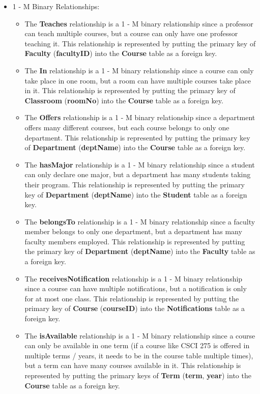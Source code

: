 \documentclass{report}
\begin{document}
\begin{itemize}
    \item 1 - M Binary Relationships:
    \begin{itemize}
        \item The \textbf{Teaches} relationship is a 1 - M binary relationship since a professor can teach multiple courses, but a course can only have one professor teaching it. This relationship is represented by putting the primary key of \textbf{Faculty} (\textbf{facultyID}) into the \textbf{Course} table as a foreign key.
        \item The \textbf{In} relationship is a 1 - M binary relationship since a course can only take place in one room, but a room can have multiple courses take place in it. This relationship is represented by putting the primary key of \textbf{Classroom} (\textbf{roomNo}) into the \textbf{Course} table as a foreign key.
        \item The \textbf{Offers} relationship is a 1 - M binary relationship since a department offers many different courses, but each course belongs to only one department. This relationship is represented by putting the primary key of \textbf{Department} (\textbf{deptName}) into the \textbf{Course} table as a foreign key.
        \item The \textbf{hasMajor} relationship is a 1 - M binary relationship since a student can only declare one major, but a department has many students taking their program. This relationship is represented by putting the primary key of \textbf{Department} (\textbf{deptName}) into the \textbf{Student} table as a foreign key.
        \item The \textbf{belongsTo} relationship is a 1 - M binary relationship since a faculty member belongs to only one department, but a department has many faculty members employed. This relationship is represented by putting the primary key of \textbf{Department} (\textbf{deptName}) into the \textbf{Faculty} table as a foreign key.
        \item The \textbf{receivesNotification} relationship is a 1 - M binary relationship since a course can have multiple notifications, but a notification is only for at most one class. This relationship is represented by putting the primary key of \textbf{Course} (\textbf{courseID}) into the \textbf{Notifications} table as a foreign key.
        \item The \textbf{isAvailable} relationship is a 1 - M binary relationship since a course can only be available in one term (if a course like CSCI 275 is offered in multiple terms / years, it needs to be in the course table multiple times), but a term can have many courses available in it. This relationship is represented by putting the primary keys of \textbf{Term} (\textbf{term}, \textbf{year}) into the \textbf{Course} table as a foreign key.

\end{itemize}
\end{itemize}
\end{document}
